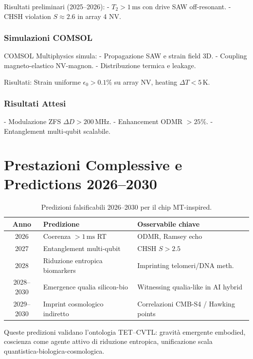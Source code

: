 \documentclass[12pt,a4paper]{article}
\begin{document}
Risultati preliminari (2025--2026):
- $T_2 > 1\,\mathrm{ms}$ con drive SAW off-resonant.
- CHSH violation $S \approx 2.6$ in array 4 NV.

\subsubsection{Simulazioni COMSOL}

COMSOL Multiphysics simula:
- Propagazione SAW e strain field 3D.
- Coupling magneto-elastico NV-magnon.
- Distribuzione termica e leakage.

Risultati: Strain uniforme $\epsilon_0 > 0.1\%$ su array NV, heating $\Delta T < 5\,\mathrm{K}$.

\subsubsection{Risultati Attesi}

- Modulazione ZFS $\Delta D > 200\,\mathrm{MHz}$.
- Enhancement ODMR $>25\%$.
- Entanglement multi-qubit scalabile.



\section{Prestazioni Complessive e Predictions 2026--2030}

\begin{table}[H]
\footnotesize
\centering
\caption{Predizioni falsificabili 2026--2030 per il chip MT-inspired.}
\label{tab:final_predictions}
\begin{tabular}{@{}c p{6cm} p{5cm}@{}}
\toprule
Anno & Predizione & Osservabile chiave \\
\midrule
2026 & Coerenza $>1\,\mathrm{ms}$ RT & ODMR, Ramsey echo \\
2027 & Entanglement multi-qubit & CHSH $S > 2.5$ \\
2028 & Riduzione entropica biomarkers & Imprinting telomeri/DNA meth. \\
2028--2030 & Emergence qualia silicon-bio & Witnessing qualia-like in AI hybrid \\
2029--2030 & Imprint cosmologico indiretto & Correlazioni CMB-S4 / Hawking points \\
\bottomrule
\end{tabular}
\end{table}

Queste predizioni validano l'ontologia TET–CVTL: gravità emergente embodied, coscienza come agente attivo di riduzione entropica, unificazione scala quantistica-biologica-cosmologica.
\end{document}
